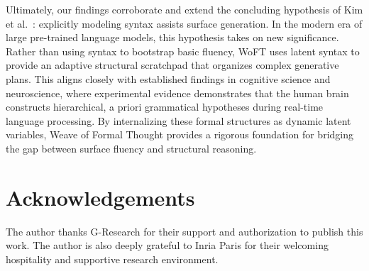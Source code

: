 \documentclass[11pt]{article}
\theoremstyle{plain}
\theoremstyle{definition}
\begin{document}
Ultimately, our findings corroborate and extend the concluding hypothesis of Kim
et al.~\cite{kim-etal-2019}: explicitly modeling syntax assists surface
generation. In the modern era of large pre-trained language models, this
hypothesis takes on new significance. Rather than using syntax to bootstrap
basic fluency, WoFT uses latent syntax to provide an adaptive structural
scratchpad that organizes complex generative plans. This aligns closely with
established findings in cognitive science and neuroscience, where experimental
evidence demonstrates that the human brain constructs hierarchical, a priori
grammatical hypotheses during real-time language processing. By internalizing
these formal structures as dynamic latent variables, Weave of Formal Thought
provides a rigorous foundation for bridging the gap between surface fluency and
structural reasoning.

\section*{Acknowledgements}
The author thanks G-Research for their support and authorization to publish this
work. The author is also deeply grateful to Inria Paris for their welcoming
hospitality and supportive research environment.



\end{document}
